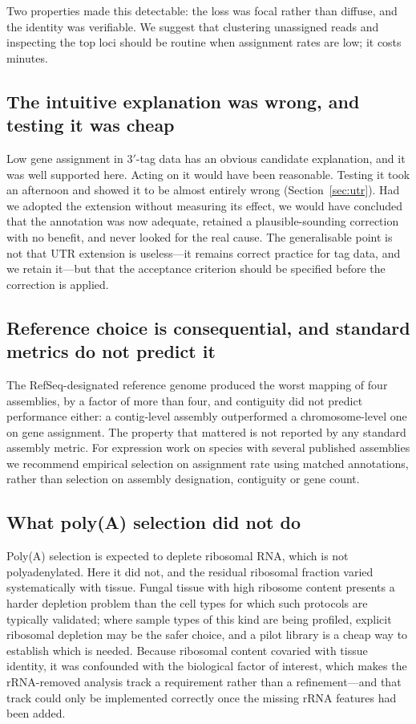 Two properties made this detectable: the loss was focal rather than diffuse, and the identity
was verifiable. We suggest that clustering unassigned reads and inspecting the top loci should
be routine when assignment rates are low; it costs minutes.

\subsection{The intuitive explanation was wrong, and testing it was cheap}

Low gene assignment in 3$'$-tag data has an obvious candidate explanation, and it was well
supported here. Acting on it would have been reasonable. Testing it took an afternoon and
showed it to be almost entirely wrong (Section~\ref{sec:utr}). Had we adopted the extension
without measuring its effect, we would have concluded that the annotation was now adequate,
retained a plausible-sounding correction with no benefit, and never looked for the real cause.
The generalisable point is not that UTR extension is useless---it remains correct practice for
tag data, and we retain it---but that the acceptance criterion should be specified before the
correction is applied.

\subsection{Reference choice is consequential, and standard metrics do not predict it}

The RefSeq-designated reference genome produced the worst mapping of four assemblies, by a
factor of more than four, and contiguity did not predict performance either: a contig-level
assembly outperformed a chromosome-level one on gene assignment. The property that mattered is
not reported by any standard assembly metric. For expression work on species with several
published assemblies we recommend empirical selection on assignment rate using matched
annotations, rather than selection on assembly designation, contiguity or gene count.

\subsection{What poly(A) selection did not do}\label{sec:polya}

Poly(A) selection is expected to deplete ribosomal RNA, which is not polyadenylated. Here it
did not, and the residual ribosomal fraction varied systematically with tissue. Fungal tissue
with high ribosome content presents a harder depletion problem than the cell types for which
such protocols are typically validated; where sample types of this kind are being profiled,
explicit ribosomal depletion may be the safer choice, and a pilot library is a cheap way to
establish which is needed. Because ribosomal content covaried with tissue identity, it was
confounded with the biological factor of interest, which makes the rRNA-removed analysis track
a requirement rather than a refinement---and that track could only be implemented correctly
once the missing rRNA features had been added.

